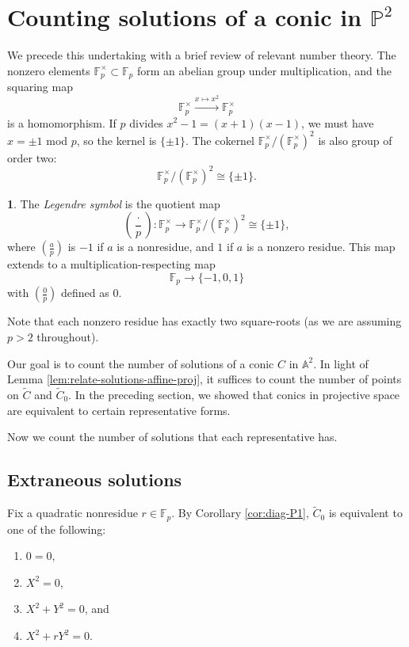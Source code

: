 \documentclass[10pt,a4paper]{amsart}
\numberwithin{equation}{section}
\numberwithin{figure}{section}
\theoremstyle{definition}
\theoremstyle{remark}
\theoremstyle{plain}
\theoremstyle{plain}
\theoremstyle{definition}
\newtheorem{defn}{\protect\definitionname}[section]
\theoremstyle{plain}
\theoremstyle{plain}
\providecommand{\definitionname}{Definition}
\newcommand{\legendre}[2]{\genfrac{(}{)}{}{}{#1}{#2}}
\newcommand{\A}{\mathbb{A}}
\renewcommand{\P}{\mathbb{P}}
\newcommand{\F}{\mathbb{F}}
\begin{document}
    \section{Counting solutions of a conic in $\P^2$}\label{sec:proj-solutions}

	We precede this undertaking with a brief review of relevant number theory.
	The nonzero elements $\F_p^\times \subset \F_p$ form an abelian
	group under multiplication, and the squaring map 
	\[ \F^\times_p \xrightarrow{x \mapsto x^2} \F^\times_p \] 
	is a homomorphism. If $p$ divides $x^2 - 1 = (x+1)(x-1)$, we must have 
	$x = \pm 1$ mod $p$, so the kernel is $\{\pm 1\}$. 
	The cokernel $\F_p^\times / (\F_p^\times)^2$ is also group of order two: 
	\[ \F_p^\times / (\F_p^\times)^2 \cong \{\pm 1\}.  \]
	\begin{defn}
		The \emph{Legendre symbol} is the quotient map    
		\[ \legendre{\cdot}{p}: 
		\F_p^\times \to \F_p^\times / (\F_p^\times)^2 \cong \{\pm 1\}, \]
		where $\legendre{a}{p}$ is $-1$ if $a$ is a nonresidue,
		and $1$ if $a$ is a nonzero residue. This map extends to a multiplication-respecting map
		\[ \F_p \to \{-1,0,1\} \]
		with $\legendre{0}{p}$ defined as $0$.
	\end{defn}
	
	Note that each nonzero residue has exactly two square-roots (as we are assuming
	$p > 2$ throughout).
	
	Our goal is to count the number of solutions of a conic $C$ in $\A^2$. In light of Lemma \ref{lem:relate-solutions-affine-proj}, it suffices to count the number of points on $\widetilde{C}$ and $\widetilde{C}_0$. In the preceding section, we showed that conics in projective space are equivalent to certain representative forms.
	
	Now we count the number of solutions that each representative has.
	
	\subsection{Extraneous solutions}
	\label{subsec:counting-P1-solutions}
	
	Fix a quadratic nonresidue $r \in \F_p$. By Corollary \ref{cor:diag-P1}, $\widetilde{C}_0$ is equivalent to one of the following:
	\begin{enumerate} 
		\item $0 = 0$, 
		\item $X^2 = 0$,
		\item $X^2 + Y^2 = 0$, and \label{case:x^2+y^2=0}
		\item $X^2 + rY^2 = 0$.  
	\end{enumerate}
	
\end{document}
